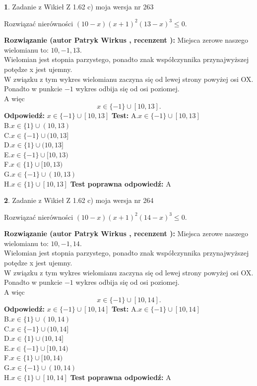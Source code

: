 \documentclass[12pt, a4paper]{article}
\theoremstyle{definition} %
\newtheorem{zad}{}
\newcommand{\zadStart}[1]{\begin{zad}#1\newline}
\newcommand{\zadStop}{\end{zad}}
\newcommand{\rozwStart}[2]{\noindent \textbf{Rozwiązanie (autor #1 , recenzent #2): }\newline}
\newcommand{\rozwStop}{\newline}
\newcommand{\odpStart}{\noindent \textbf{Odpowiedź:}\newline}
\newcommand{\odpStop}{\newline}
\newcommand{\testStart}{\noindent \textbf{Test:}\newline}
\newcommand{\testStop}{\newline}
\newcommand{\kluczStart}{\noindent \textbf{Test poprawna odpowiedź:}\newline}
\newcommand{\kluczStop}{\newline}
\begin{document}
\zadStart{Zadanie z Wikieł Z 1.62 c) moja wersja nr 263}

Rozwiązać nierówności $(10-x)(x+1)^{2}(13-x)^{3}\le0$.
\zadStop
\rozwStart{Patryk Wirkus}{}
Miejsca zerowe naszego wielomianu to: $10, -1, 13$.\\
Wielomian jest stopnia parzystego, ponadto znak współczynnika przy\linebreak najwyższej potędze x jest ujemny.\\ W związku z tym wykres wielomianu zaczyna się od lewej strony powyżej osi OX.\\
Ponadto w punkcie $-1$ wykres odbija się od osi poziomej.\\
A więc $$x \in \{-1\} \cup [10,13].$$
\rozwStop
\odpStart
$x \in \{-1\} \cup [10,13]$
\odpStop
\testStart
A.$x \in \{-1\} \cup [10,13]$\\
B.$x \in \{1\} \cup (10,13)$\\
C.$x \in \{-1\} \cup (10,13]$\\
D.$x \in \{1\} \cup (10,13]$\\
E.$x \in \{-1\} \cup [10,13)$\\
F.$x \in \{1\} \cup [10,13)$\\
G.$x \in \{-1\} \cup (10,13)$\\
H.$x \in \{1\} \cup [10,13]$
\testStop
\kluczStart
A
\kluczStop



\zadStart{Zadanie z Wikieł Z 1.62 c) moja wersja nr 264}

Rozwiązać nierówności $(10-x)(x+1)^{2}(14-x)^{3}\le0$.
\zadStop
\rozwStart{Patryk Wirkus}{}
Miejsca zerowe naszego wielomianu to: $10, -1, 14$.\\
Wielomian jest stopnia parzystego, ponadto znak współczynnika przy\linebreak najwyższej potędze x jest ujemny.\\ W związku z tym wykres wielomianu zaczyna się od lewej strony powyżej osi OX.\\
Ponadto w punkcie $-1$ wykres odbija się od osi poziomej.\\
A więc $$x \in \{-1\} \cup [10,14].$$
\rozwStop
\odpStart
$x \in \{-1\} \cup [10,14]$
\odpStop
\testStart
A.$x \in \{-1\} \cup [10,14]$\\
B.$x \in \{1\} \cup (10,14)$\\
C.$x \in \{-1\} \cup (10,14]$\\
D.$x \in \{1\} \cup (10,14]$\\
E.$x \in \{-1\} \cup [10,14)$\\
F.$x \in \{1\} \cup [10,14)$\\
G.$x \in \{-1\} \cup (10,14)$\\
H.$x \in \{1\} \cup [10,14]$
\testStop
\kluczStart
A
\kluczStop
\end{document}
